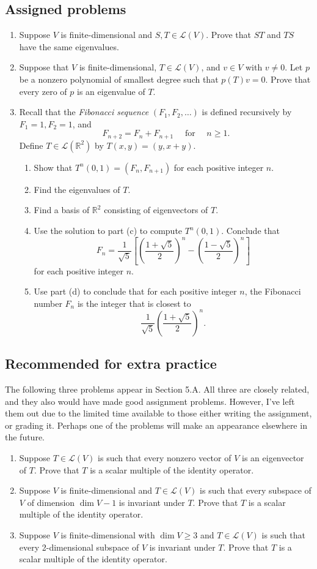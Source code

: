 \documentclass[letterpaper,12pt]{article}
\newcommand{\R}{\mathbb{R}}
\begin{document}
\subsection*{Assigned problems}
\begin{enumerate}
 \item Suppose $V$ is finite-dimensional and $S,T\in\mathcal{L}(V)$. Prove that $ST$ and $TS$ have the same eigenvalues.
 \item Suppose that $V$ is finite-dimensional, $T\in\mathcal{L}(V)$, and $v\in V$ with $v\neq 0$. Let $p$ be a nonzero polynomial of smallest degree such that $p(T)v=0$. Prove that every zero of $p$ is an eigenvalue of $T$.
 \item Recall that the {\em Fibonacci sequence} $(F_1,F_2,\ldots)$ is defined recursively by $F_1=1, F_2=1$, and
 \[
 F_{n+2} = F_{n}+F_{n+1} \quad\text{ for }\quad n\geq 1.
 \]
 Define $T\in\mathcal{L}(\R^2)$ by $T(x,y) = (y,x+y)$.
 \begin{enumerate}
 \item Show that $T^n(0,1)=(F_n,F_{n+1})$ for each positive integer $n$.
 \item Find the eigenvalues of $T$.
 \item Find a basis of $\R^2$ consisting of eigenvectors of $T$.
 \item Use the solution to part (c) to compute $T^n(0,1)$. Conclude that
 \[
 F_n = \frac{1}{\sqrt{5}}\left[\left(\frac{1+\sqrt{5}}{2}\right)^n-\left(\frac{1-\sqrt{5}}{2}\right)^n\right]
 \]
 for each positive integer $n$.
 \item Use part (d) to conclude that for each positive integer $n$, the Fibonacci number $F_n$ is the integer that is closest to 
 \[
 \frac{1}{\sqrt{5}}\left(\frac{1+\sqrt{5}}{2}\right)^n.
 \]
 \end{enumerate}
 \end{enumerate}
 \subsection*{Recommended for extra practice}
 The following three problems appear in Section 5.A. All three are closely related, and they also would have made good assignment problems. However, I've left them out due to the limited time available  to  those either writing the assignment, or grading it. Perhaps one of the problems will make an appearance elsewhere in the future.
 \begin{enumerate}
 \item Suppose $T\in\mathcal{L}(V)$ is such that every nonzero vector of $V$ is an eigenvector of $T$. Prove that $T$ is a scalar multiple of the identity operator.
 \item Suppose $V$ is finite-dimensional and $T\in\mathcal{L}(V)$ is such that every subspace of $V$ of dimension $\dim V-1$ is invariant under $T$. Prove that $T$ is a scalar multiple of the identity operator.
 \item Suppose $V$ is finite-dimensional with $\dim V\geq 3$ and $T\in\mathcal{L}(V)$ is such that every 2-dimensional subspace of $V$ is invariant under $T$. Prove that $T$ is a scalar multiple of the identity operator.
 \end{enumerate}
\end{document}
